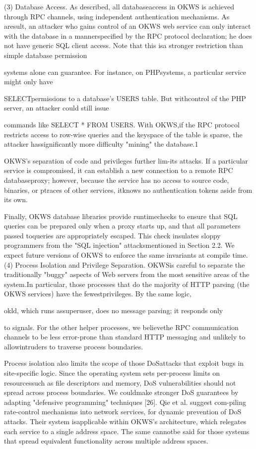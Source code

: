 (3) Database Access. As described, all databaseaccess in OKWS is achieved through RPC channels,
using independent authentication mechanisms. As aresult, an attacker who gains control of an OKWS web
service can only interact with the database in a mannerspecified by the RPC protocol declaration; he does
not have generic SQL client access. Note that this isa stronger restriction than simple database permission

systems alone can guarantee. For instance, on PHPsystems, a particular service might only have

SELECTpermissions to a database's
USERS table. But withcontrol of the PHP server, an attacker could still issue

commands like SELECT * FROM USERS. With OKWS,if the RPC protocol restricts access to row-wise queries
and the keyspace of the table is sparse, the attacker hassignificantly more difficulty "mining" the database.1

OKWS's separation of code and privileges further lim-its attacks. If a particular service is compromised, it can
establish a new connection to a remote RPC databaseproxy; however, because the service has no access to
source code, binaries, or ptraces of other services, itknows no authentication tokens aside from its own.

Finally, OKWS database libraries provide runtimechecks to ensure that SQL queries can be prepared only
when a proxy starts up, and that all parameters passed toqueries are appropriately escaped. This check insulates
sloppy programmers from the "SQL injection" attacksmentioned in Section 2.2. We expect future versions of
OKWS to enforce the same invariants at compile time.
(4) Process Isolation and Privilege Separation. OKWSis careful to separate the traditionally "buggy" aspects of
Web servers from the most sensitive areas of the system.In particular, those processes that do the majority of
HTTP parsing (the OKWS services) have the fewestprivileges. By the same logic,

okld, which runs assuperuser, does no message parsing; it responds only

to signals. For the other helper processes, we believethe RPC communication channels to be less error-prone
than standard HTTP messaging and unlikely to allowintruders to traverse process boundaries.

Process isolation also limits the scope of those DoSattacks that exploit bugs in site-specific logic. Since
the operating system sets per-process limits on resourcessuch as file descriptors and memory, DoS vulnerabilities
should not spread across process boundaries. We couldmake stronger DoS guarantees by adapting "defensive
programming" techniques [26]. Qie et al. suggest com-piling rate-control mechanisms into network services, for
dynamic prevention of DoS attacks. Their system isapplicable within OKWS's architecture, which relegates
each service to a single address space. The same cannotbe said for those systems that spread equivalent functionality across multiple address spaces.

